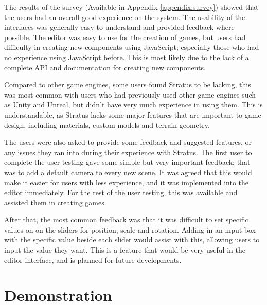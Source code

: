 	The results of the survey (Available in Appendix \ref{appendix:survey}) showed that the users had an overall good experience on the system. The usability of the interfaces was generally easy to understand and provided feedback where possible. The editor was easy to use for the creation of games, but users had difficulty in creating new components using JavaScript; especially those who had no experience using JavaScript before. This is most likely due to the lack of a complete API and documentation for creating new components.

	Compared to other game engines, some users found Stratus to be lacking, this was most common with users who had previously used other game engines such as Unity and Unreal, but didn't have very much experience in using them. This is understandable, as Stratus lacks some major features that are important to game design, including materials, custom models and terrain geometry.

	The users were also asked to provide some feedback and suggested features, or any issues they ran into during their experience with Stratus. The first user to complete the user testing gave some simple but very important feedback; that was to add a default camera to every new scene. It was agreed that this would make it easier for users with less experience, and it was implemented into the editor immediately. For the rest of the user testing, this was available and assisted them in creating games.

	After that, the most common feedback was that it was difficult to set specific values on on the sliders for position, scale and rotation. Adding in an input box with the specific value beside each slider would assist with this, allowing users to input the value they want. This is a feature that would be very useful in the editor interface, and is planned for future developments.

\section{Demonstration}

